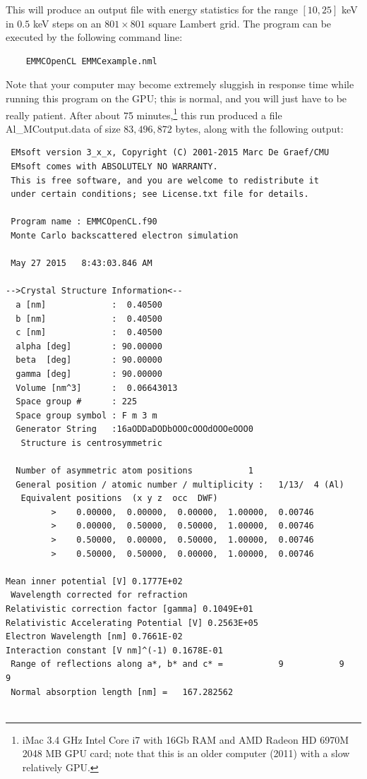 \documentclass[DIV=calc, paper=letter, fontsize=11pt]{scrartcl}	 %
\begin{document}
This will produce an output file with energy statistics for the range $[10,25]$ keV in $0.5$ keV steps
on an $801\times 801$ square Lambert grid.  The program can be executed by the following command line:
\begin{verbatim}
	EMMCOpenCL EMMCexample.nml
\end{verbatim}
Note that your computer may become extremely sluggish in response time while running this program on the GPU;
this is normal, and you will just have to be really patient.
After about 75 minutes,\footnote{iMac 3.4 GHz Intel Core i7 with 16Gb RAM and AMD Radeon HD 6970M 2048 MB GPU card; note that this is an older 
computer (2011) with a slow relatively GPU. } 
this run produced a file \textsf{Al\_MCoutput.data} of size $83,496,872$ bytes, along with the following output:
\begin{verbatim}
 EMsoft version 3_x_x, Copyright (C) 2001-2015 Marc De Graef/CMU
 EMsoft comes with ABSOLUTELY NO WARRANTY.
 This is free software, and you are welcome to redistribute it
 under certain conditions; see License.txt file for details.

 Program name : EMMCOpenCL.f90
 Monte Carlo backscattered electron simulation

 May 27 2015   8:43:03.846 AM

-->Crystal Structure Information<--
  a [nm]             :  0.40500
  b [nm]             :  0.40500
  c [nm]             :  0.40500
  alpha [deg]        : 90.00000
  beta  [deg]        : 90.00000
  gamma [deg]        : 90.00000
  Volume [nm^3]      :  0.06643013
  Space group #      : 225
  Space group symbol : F m 3 m
  Generator String   :16aODDaDODbOOOcOOOdOOOeOOO0
   Structure is centrosymmetric

  Number of asymmetric atom positions           1
  General position / atomic number / multiplicity :   1/13/  4 (Al)
   Equivalent positions  (x y z  occ  DWF)
         >    0.00000,  0.00000,  0.00000,  1.00000,  0.00746
         >    0.00000,  0.50000,  0.50000,  1.00000,  0.00746
         >    0.50000,  0.00000,  0.50000,  1.00000,  0.00746
         >    0.50000,  0.50000,  0.00000,  1.00000,  0.00746

Mean inner potential [V] 0.1777E+02
 Wavelength corrected for refraction
Relativistic correction factor [gamma] 0.1049E+01
Relativistic Accelerating Potential [V] 0.2563E+05
Electron Wavelength [nm] 0.7661E-02
Interaction constant [V nm]^(-1) 0.1678E-01
 Range of reflections along a*, b* and c* =           9           9           9
 Normal absorption length [nm] =   167.282562    


\end{verbatim}
\end{document}
